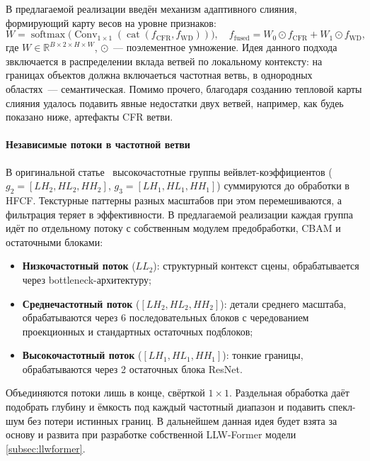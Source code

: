 В предлагаемой реализации введён механизм адаптивного слияния, формирующий карту весов на уровне признаков:
\begin{equation}
    W = \operatorname{softmax}\bigl( \operatorname{Conv}_{1\times1}(\operatorname{cat}(f_{\text{CFR}}, f_{\text{WD}})) \bigr), \quad
    f_{\text{fused}} = W_0 \odot f_{\text{CFR}} + W_1 \odot f_{\text{WD}},
\end{equation}
где $W \in \mathbb{R}^{B \times 2 \times H \times W}$, $\odot$~--- поэлементное умножение.
Идея данного подхода звключается в распределении вклада ветвей по локальному контексту: на границах объектов должна включаеться частотная ветвь, в однородных областях~--- семантическая.
Помимо прочего, благодаря созданию тепловой карты слияния удалось подавить явные недостатки двух ветвей, например, как будеь показано ниже, артефакты CFR ветви.

\paragraph{Независимые потоки в частотной ветви}
В оригинальной статье~\cite{wei2023cfrwd} высокочастотные группы вейвлет-коэффициентов ($g_2 = [LH_2, HL_2, HH_2]$, $g_3 = [LH_1, HL_1, HH_1]$) суммируются до обработки в HFCF.
Текстурные паттерны разных масштабов при этом перемешиваются, а фильтрация теряет в эффективности.
В предлагаемой реализации каждая группа идёт по отдельному потоку с собственным модулем предобработки, CBAM и остаточными блоками:
\begin{itemize}
    \item \textbf{Низкочастотный поток} ($LL_2$): структурный контекст сцены, обрабатывается через bottleneck-архитектуру;
    \item \textbf{Среднечастотный поток} ($[LH_2, HL_2, HH_2]$): детали среднего масштаба, обрабатываются через 6 последовательных блоков с чередованием проекционных и стандартных остаточных подблоков;
    \item \textbf{Высокочастотный поток} ($[LH_1, HL_1, HH_1]$): тонкие границы, обрабатываются через 2 остаточных блока ResNet.
\end{itemize}
Объединяются потоки лишь в конце, свёрткой $1 \times 1$.
Раздельная обработка даёт подобрать глубину и ёмкость под каждый частотный диапазон и подавить спекл-шум без потери истинных границ.
В дальнейшем данная идея будет взята за основу и развита при разработке собственной LLW-Former модели \ref{subsec:llwformer}.

